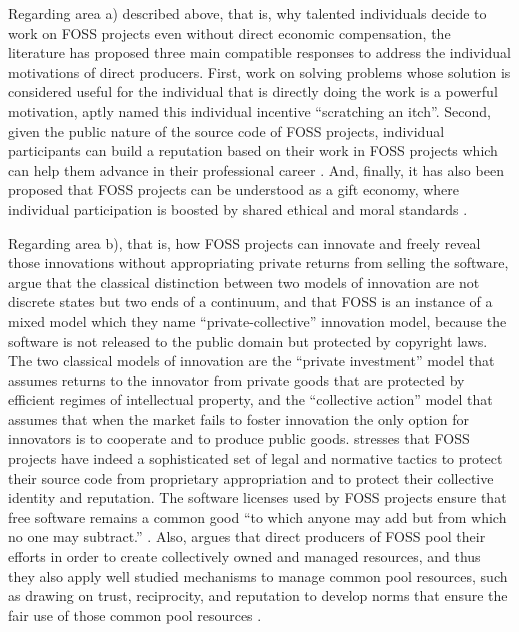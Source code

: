 Regarding area a) described above, that is, why talented individuals decide to work on FOSS projects even without direct economic compensation, the literature has proposed three main compatible responses to address the individual motivations of direct producers. First, work on solving problems whose solution is considered useful for the individual that is directly doing the work is a powerful motivation, \citet{raymond:1999} aptly named this individual incentive ``scratching an itch''. Second, given the public nature of the source code of FOSS projects, individual participants can build a reputation based on their work in FOSS projects which can help them advance in their professional career \citep{lerner:2002,roberts:2006,bagozzi:2006}. And, finally, it has also been proposed that FOSS projects can be understood as a gift economy, where individual participation is boosted by shared ethical and moral standards \citep{coleman:2004}.

Regarding area b), that is, how FOSS projects can innovate and freely reveal those innovations without appropriating private returns from selling the software, \citet{hippel:2003} argue that the classical distinction between two models of innovation are not discrete states but two ends of a continuum, and that FOSS is an instance of a mixed model which they name ``private-collective'' innovation model, because the software is not released to the public domain but protected by copyright laws. The two classical models of innovation are the ``private investment'' model that assumes returns to the innovator from private goods that are protected by efficient regimes of intellectual property, and the ``collective action'' model that assumes that when the market fails to foster innovation the only option for innovators is to cooperate and to produce public goods. \citet{omahony:2003} stresses that FOSS projects have indeed a sophisticated set of legal and normative tactics to protect their source code from proprietary appropriation and to protect their collective identity and reputation. The software licenses used by FOSS projects ensure that free software remains a common good ``to which anyone may add but from which no one may subtract.'' \citep{moglen:1999}. Also, \citet[17]{omahony:2003} argues that direct producers of FOSS pool their efforts in order to create collectively owned and managed resources, and thus they also apply well studied mechanisms to manage common pool resources, such as drawing on trust, reciprocity, and reputation to develop norms that ensure the fair use of those common pool resources \citep{ostrom:1999}.

